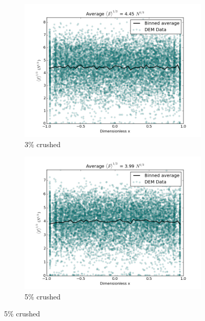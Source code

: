 \begin{figure}[!ht]
	\begin{subfigure}[b]{0.4\textwidth}
		\centering
		\includegraphics[width=\textwidth]{chapters/figures/heating_dte-02/3/dump/force-profile.png}
		\caption{3\% crushed}
	\end{subfigure}
	\begin{subfigure}[b]{0.4\textwidth}
		\centering
		\includegraphics[width=\textwidth]{chapters/figures/heating_dte-02/5/dump/force-profile.png}
		\caption{5\% crushed}
	\end{subfigure}


\end{figure}
